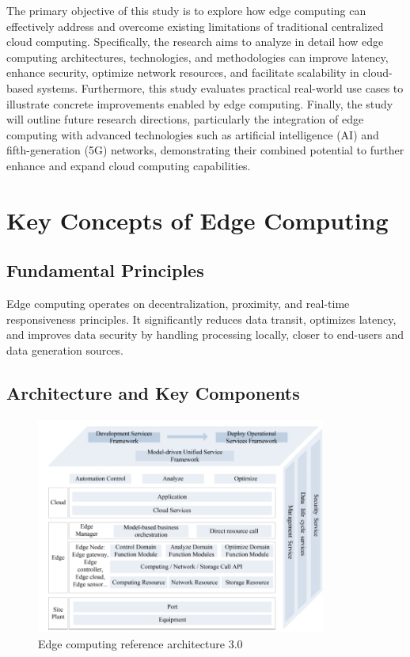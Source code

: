 \documentclass[runningheads]{llncs}
\begin{document}
The primary objective of this study is to explore how edge computing can effectively address and overcome existing limitations of traditional centralized cloud computing. Specifically, the research aims to analyze in detail how edge computing architectures, technologies, and methodologies can improve latency, enhance security, optimize network resources, and facilitate scalability in cloud-based systems. Furthermore, this study evaluates practical real-world use cases to illustrate concrete improvements enabled by edge computing. Finally, the study will outline future research directions, particularly the integration of edge computing with advanced technologies such as artificial intelligence (AI) and fifth-generation (5G) networks, demonstrating their combined potential to further enhance and expand cloud computing capabilities.


\section{Key Concepts of Edge Computing}
\subsection{Fundamental Principles}
Edge computing operates on decentralization, proximity, and real-time responsiveness principles. It significantly reduces data transit, optimizes latency, and improves data security by handling processing locally, closer to end-users and data generation sources.


\subsection{Architecture and Key Components}

\begin{figure}[ht]
    \centering
    \includegraphics[width=0.85\textwidth]{IMG/6.png}
    \caption{Edge computing reference architecture 3.0}
    \label{fig:edge_reference_architecture}
    \end{figure}
\FloatBarrier
\end{document}

